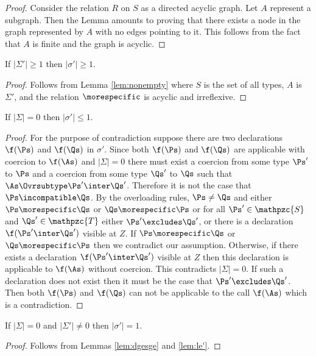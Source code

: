 \begin{proof}
Consider the relation $R$ on $S$ as a directed acyclic graph.  Let $A$
represent a subgraph.  Then the Lemma amounts to proving that there
exists a node in the graph represented by $A$ with no edges pointing
to it.  This follows from the fact that $A$ is finite and the graph is
acyclic.
\end{proof}

\begin{lemma}
\label{lem:dgesge}
If $|\Sigma'| \ge 1$ then $|\sigma'| \ge 1$.
\end{lemma}

\begin{proof}
Follows from Lemma \ref{lem:nonempty} where $S$ is the set of all
types, $A$ is %
$\Sigma'$, %
and the relation %
$\morespecific$ is acyclic and irreflexive.
\end{proof}

\begin{lemma}
\label{lem:le'}
If $|\Sigma| = 0$ then $|\sigma'| \le 1$.
\end{lemma}

\begin{proof}
For the purpose of contradiction suppose there are two declarations
$\f(\Ps)$ and $\f(\Qs)$ in $\sigma'$.  Since both $\f(\Ps)$ and
$\f(\Qs)$ are applicable with coercion to $\f(\As)$ and $|\Sigma| =
0$ there must exist a coercion from some type $\Ps'$ to $\Ps$ and a
coercion from some type $\Qs'$ to $\Qs$ such that $\As \Ovrsubtype
\Ps' \inter \Qs'$.  Therefore it is not the case that $\Ps
\incompatible \Qs$.  By the overloading rules, $\Ps \neq \Qs$
and either $\Ps \morespecific \Qs$ or $\Qs \morespecific \Ps$ or
for all $\Ps' \in \mathpzc{S}$ and $\Qs' \in \mathpzc{T}$ either $\Ps'
\excludes \Qs'$, or there is a declaration $\f(\Ps' \inter \Qs')$
visible at $Z$.  If $\Ps \morespecific \Qs$ or $\Qs \morespecific
\Ps$ then we contradict our assumption.  Otherwise, if there exists a
declaration $\f(\Ps' \inter \Qs')$ visible at $Z$ then this
declaration is applicable to $\f(\As)$ without coercion.  This
contradicts $|\Sigma| = 0$.  If such a declaration does not exist then
it must be the case that $\Ps' \excludes \Qs'$.  Then both $\f(\Ps)$
and $\f(\Qs)$ can not be applicable to the call $\f(\As)$ which is a
contradiction.
\end{proof}

\begin{theorem}
\label{thm:overloading-coercion}
If $|\Sigma| = 0$ and $|\Sigma'| \neq 0$ then $|\sigma'| = 1$.
\end{theorem}

\begin{proof}
Follows from Lemmas \ref{lem:dgesge} and \ref{lem:le'}.
\end{proof}
